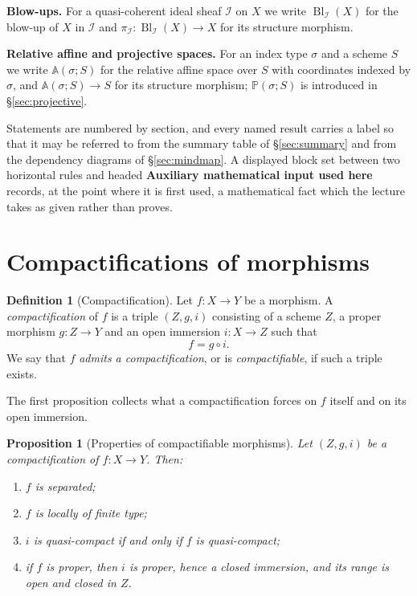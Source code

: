 \documentclass[11pt,a4paper]{article}
\theoremstyle{plain}
\newtheorem{proposition}[theorem]{Proposition}
\theoremstyle{definition}
\newtheorem{definition}[theorem]{Definition}
\theoremstyle{remark}
\newcommand{\Bl}{\operatorname{Bl}}
\newcommand{\sI}{\mathcal{I}}
\newcommand{\Aff}{\mathbb{A}}
\newcommand{\Pj}{\mathbb{P}}
\begin{document}
\medskip\noindent\textbf{Blow-ups.}
For a quasi-coherent ideal sheaf $\sI$ on $X$ we write $\Bl_\sI(X)$ for the
blow-up of $X$ in $\sI$ and $\pi_\sI\colon\Bl_\sI(X)\to X$ for its structure
morphism.

\medskip\noindent\textbf{Relative affine and projective spaces.}
For an index type $\sigma$ and a scheme $S$ we write $\Aff(\sigma;S)$ for the
relative affine space over $S$ with coordinates indexed by $\sigma$, and
$\Aff(\sigma;S)\to S$ for its structure morphism; $\Pj(\sigma;S)$ is introduced
in \S\ref{sec:projective}.

Statements are numbered by section, and every named result carries a label so
that it may be referred to from the summary table of \S\ref{sec:summary} and
from the dependency diagrams of \S\ref{sec:mindmap}. A displayed block set
between two horizontal rules and headed \textbf{Auxiliary mathematical input
used here} records, at the point where it is first used, a mathematical fact
which the lecture takes as given rather than proves.

\section{Compactifications of morphisms}
\label{sec:compactifications}

\begin{definition}[Compactification]
\label{def:compactification}
Let $f\colon X\to Y$ be a morphism. A \emph{compactification} of $f$ is a
triple $(Z,g,i)$ consisting of a scheme $Z$, a proper morphism $g\colon Z\to
Y$ and an open immersion $i\colon X\to Z$ such that
\[
  f = g\circ i .
\]
We say that $f$ \emph{admits a compactification}, or is \emph{compactifiable},
if such a triple exists.
\end{definition}

The first proposition collects what a compactification forces on $f$ itself and
on its open immersion.

\begin{proposition}[Properties of compactifiable morphisms]
\label{prop:compactification-basic}
Let $(Z,g,i)$ be a compactification of $f\colon X\to Y$. Then:
\begin{enumerate}[label=\textup{(\roman*)}, itemsep=1pt]
\item $f$ is separated;
\item $f$ is locally of finite type;
\item $i$ is quasi-compact if and only if $f$ is quasi-compact;
\item if $f$ is proper, then $i$ is proper, hence a closed immersion, and its
      range is open and closed in $Z$.
\end{enumerate}
\end{proposition}
\end{document}
